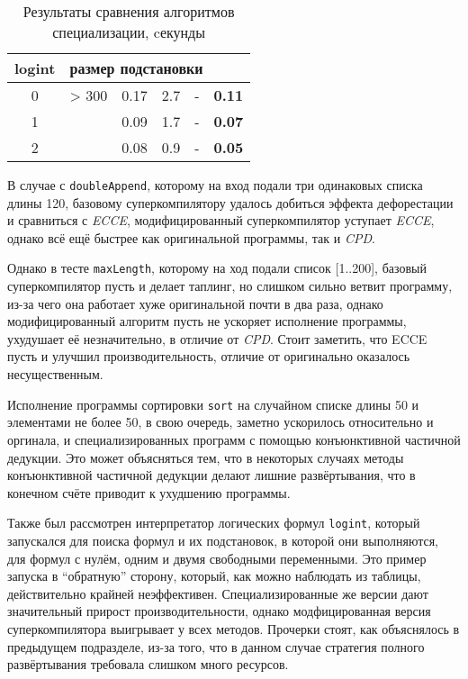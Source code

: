\begin{table}[h!]
\begin{tabular}{|c|c|c|c|c|c|}
{\bf logint} & \multicolumn{5}{|l|}{размер подстановки} \\ \hline
0 & > 300    & 0.17  & 2.7  & -  &  {\bf 0.11} \\
1 &          & 0.09  & 1.7  & -  &  {\bf 0.07} \\
2 &          & 0.08   & 0.9  & -  & {\bf 0.05} \\
\hline

\end{tabular}
\caption{Результаты сравнения алгоритмов специализации, cекунды}
\label{fig:totalResult}
\end{table}

В случае с \lstinline{doubleAppend}, которому на вход подали три одинаковых списка длины 120,
базовому суперкомпилятору удалось
добиться эффекта дефорестации и сравниться с {\it ECCE}, модифицированный суперкомпилятор
уступает {\it ECCE}, однако всё ещё быстрее как оригинальной программы, так и {\it CPD}.

Однако в тесте \lstinline{maxLength}, которому на ход подали список [1..200], базовый суперкомпилятор пусть и делает
таплинг, но слишком сильно ветвит программу, из-за чего она работает хуже оригинальной
почти в два раза, однако модифицированный алгоритм пусть не ускоряет исполнение программы,
ухудушает её незначительно, в отличие от {\it CPD}. Стоит заметить, что ECCE пусть и
улучшил производительность, отличие от оригинально оказалось несущественным.

Исполнение программы сортировки \lstinline{sort} на случайном списке длины 50 и элементами
не более 50, в свою очередь, заметно ускорилось относительно и оргинала, и специализированных
программ с помощью конъюнктивной частичной дедукции. Это может объясняться тем, что в некоторых
случаях методы конъюнктивной частичной дедукции делают лишние развёртывания, что в конечном
счёте приводит к ухудшению программы.

Также был рассмотрен интерпретатор логических формул \lstinline{logint}, который
запускался для поиска формул и их подстановок, в которой они выполняются, для
формул с нулём, одним и двумя свободными переменными. Это пример запуска в ``обратную''
сторону, который, как можно наблюдать из таблицы, действительно крайней неэффективен.
Специализированные же версии дают значительный прирост производительности, однако
модфицированная версия суперкомпилятора выигрывает у всех методов. Прочерки стоят,
как объяснялось в предыдущем подразделе, из-за того, что в данном случае стратегия
полного развёртывания требовала слишком много ресурсов.
